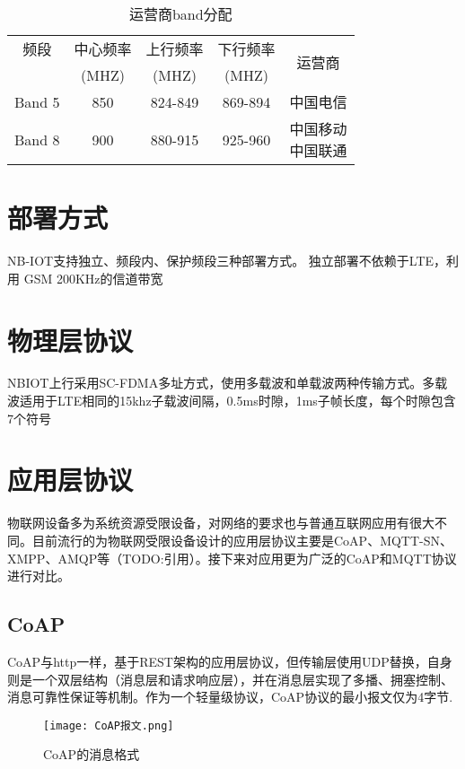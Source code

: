 \begin{table}[h!]
\caption{运营商band分配}
\begin{tabular}{ccccc}
\toprule
频段&中心频率&上行频率&下行频率&\multirow{2}{*}{运营商}\\
&(MHZ)&(MHZ)&(MHZ)&\\
\midrule
Band 5&850&824-849&869-894&中国电信\\
\midrule
Band 8&900&880-915&925-960&\makecell[c]{中国移动\\中国联通}\\
\bottomrule
\end{tabular}
\label{运营商band分配}
\end{table}


\section{部署方式}
NB-IOT支持独立、频段内、保护频段三种部署方式。
独立部署不依赖于LTE，利用 GSM 200KHz的信道带宽


\section{物理层协议}

NBIOT上行采用SC-FDMA多址方式，使用多载波和单载波两种传输方式。多载波适用于LTE相同的15khz子载波间隔，0.5ms时隙，1ms子帧长度，每个时隙包含7个符号
\section{应用层协议}

物联网设备多为系统资源受限设备，对网络的要求也与普通互联网应用有很大不同。目前流行的为物联网受限设备设计的应用层协议主要是CoAP、MQTT-SN、XMPP、AMQP等（TODO:引用）。接下来对应用更为广泛的CoAP和MQTT协议进行对比。

\subsection{CoAP}
CoAP与http一样，基于REST架构的应用层协议，但传输层使用UDP替换，自身则是一个双层结构（消息层和请求响应层），并在消息层实现了多播、拥塞控制、消息可靠性保证等机制。作为一个轻量级协议，CoAP协议的最小报文仅为4字节.

\begin{figure}[h]
	\texttt{[image: CoAP报文.png]}
	\caption{CoAP的消息格式}
	\label{CoAP报文}
\end{figure}

